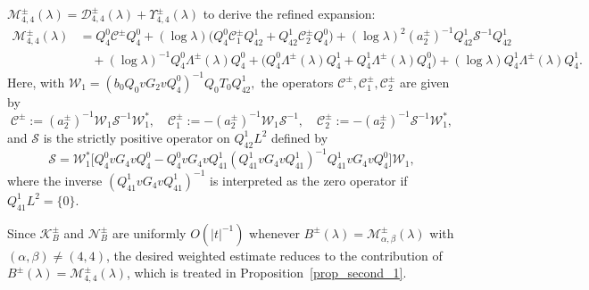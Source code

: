 \documentclass[reqno]{amsart}
\numberwithin{equation}{section}
\begin{document}
$
\mathcal M_{4,4}^\pm(\lambda)=\mathcal D_{4,4}^\pm(\lambda)+\Upsilon_{4,4}^\pm(\lambda)
$
to derive the refined expansion:
\begin{align}\label{huaM44}
\mathcal{M}_{4,4}^{\pm}(\lambda) &= Q_4^0\mathcal{C}^\pm Q_4^0 +(\log \lambda) \bigl(Q_4^0 \mathcal{C}_1^\pm Q_{42}^1 + Q_{42}^1 \mathcal{C}_2^\pm Q_4^0 \bigr)+ (\log \lambda)^2 (a_2^\pm)^{-1} Q_{42}^1 \mathcal{S}^{-1} Q_{42}^1 \nonumber \\
&  \quad + (\log \lambda)^{-1} Q_4^0\Lambda^\pm(\lambda) Q_4^0 + \bigl(Q_4^0 \Lambda^\pm(\lambda) Q_{4}^1 + Q_{4}^1 \Lambda^\pm(\lambda) Q_4^0\bigr)  +(\log \lambda) Q_{4}^1 \Lambda^\pm(\lambda) Q_{4}^1.  
\end{align}  
Here, with $\mathcal{W}_1 = (b_0 Q_0 v G_2 v Q_4^0)^{-1} Q_0 T_0 Q_{42}^1,$ the operators $\mathcal{C}^\pm, \mathcal{C}_1^\pm, \mathcal{C}_2^\pm$ are given by  
\begin{equation}\label{eq:mathcal_C}  
\mathcal{C}^\pm := (a_2^\pm)^{-1}\mathcal{W}_1 \mathcal{S}^{-1} \mathcal{W}_1^*, \quad  
\mathcal{C}_1^\pm := - (a_2^\pm)^{-1}\mathcal{W}_1 \mathcal{S}^{-1}, \quad  
\mathcal{C}_2^\pm := - (a_2^\pm)^{-1}\mathcal{S}^{-1}\mathcal{W}_1^*,
\end{equation}  
and $\mathcal{S}$ is the strictly positive operator on $Q_{42}^1 L^2$
defined by  $$
\mathcal{S} =\mathcal{W}_1^* \bigl[Q_4^0 v G_4 v Q_4^0 - Q_4^0 v G_4 v Q_{41}^1 (Q_{41}^1 v G_4 v Q_{41}^1)^{-1} Q_{41}^1 v G_4 v Q_4^0\bigr] \mathcal{W}_1,
$$
where  the inverse $(Q_{41}^1 v G_4 v Q_{41}^1)^{-1}$ is interpreted
as the zero operator  
if $Q_{41}^1L^2=\{0\}$.






Since \(\mathcal K_B^\pm\) and \(\mathcal N_B^\pm\) are uniformly
\(O(|t|^{-1})\) whenever
\(B^\pm(\lambda)=\mathcal M_{\alpha,\beta}^\pm(\lambda)\) with
\((\alpha,\beta)\neq(4,4)\), the desired weighted estimate reduces
to the contribution of
\(B^\pm(\lambda)=\mathcal M_{4,4}^\pm(\lambda)\), which is treated in
Proposition~\ref{prop_second_1}.
\end{document}
